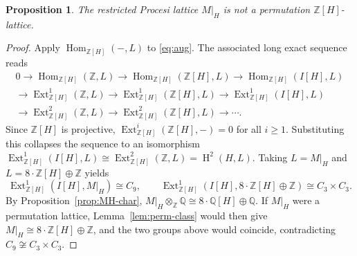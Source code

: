 \documentclass[12pt,a4paper]{article}
\newtheorem{proposition}[theorem]{Proposition}
\theoremstyle{definition}
\newtheorem{remark}[theorem]{Remark}
\DeclareMathOperator{\Hom}{Hom}
\DeclareMathOperator{\Ext}{Ext}
\DeclareMathOperator{\coh}{H}
\begin{document}

\begin{proposition}\label{prop:M_H-not-permutation}
The restricted Procesi lattice \(M|_H\) is not a permutation
\(\mathbb{Z}[H]\)-lattice.
\end{proposition}
\begin{proof}
Apply \(\Hom_{\mathbb{Z}[H]}(-, L)\) to \eqref{eq:aug}.  The associated
long exact sequence reads
\begin{multline*}
0 \longrightarrow \Hom_{\mathbb{Z}[H]}(\mathbb{Z}, L)
\longrightarrow \Hom_{\mathbb{Z}[H]}(\mathbb{Z}[H], L)
\longrightarrow \Hom_{\mathbb{Z}[H]}(I[H], L) \\
\longrightarrow \Ext^1_{\mathbb{Z}[H]}(\mathbb{Z}, L)
\longrightarrow \Ext^1_{\mathbb{Z}[H]}(\mathbb{Z}[H], L)
\longrightarrow \Ext^1_{\mathbb{Z}[H]}(I[H], L) \\
\longrightarrow \Ext^2_{\mathbb{Z}[H]}(\mathbb{Z}, L)
\longrightarrow \Ext^2_{\mathbb{Z}[H]}(\mathbb{Z}[H], L)
\longrightarrow \cdots .
\end{multline*}
Since \(\mathbb{Z}[H]\) is projective,
\(\Ext^i_{\mathbb{Z}[H]}(\mathbb{Z}[H], {-}) = 0\) for all \(i \ge 1\).
Substituting this collapses the sequence to an isomorphism
\(\Ext^1_{\mathbb{Z}[H]}(I[H], L) \cong \Ext^2_{\mathbb{Z}[H]}(\mathbb{Z}, L)
= \coh^2(H, L)\).
Taking \(L = M|_H\) and \(L = 8\cdot\mathbb{Z}[H] \oplus \mathbb{Z}\)
yields
\[
\Ext^1_{\mathbb{Z}[H]}(I[H], M|_H) \cong C_9,\qquad
\Ext^1_{\mathbb{Z}[H]}(I[H], 8\cdot\mathbb{Z}[H] \oplus \mathbb{Z})
\cong C_3 \times C_3 .
\]
By Proposition~\ref{prop:MH-char},
\(M|_H \otimes_{\mathbb{Z}} \mathbb{Q} \cong
8\cdot\mathbb{Q}[H] \oplus \mathbb{Q}\).  If \(M|_H\) were a
permutation lattice, Lemma~\ref{lem:perm-class} would then give
\(M|_H \cong 8\cdot\mathbb{Z}[H] \oplus \mathbb{Z}\), and the two groups
above would coincide, contradicting \(C_9 \not\cong C_3 \times C_3\).
\end{proof}
\end{document}
